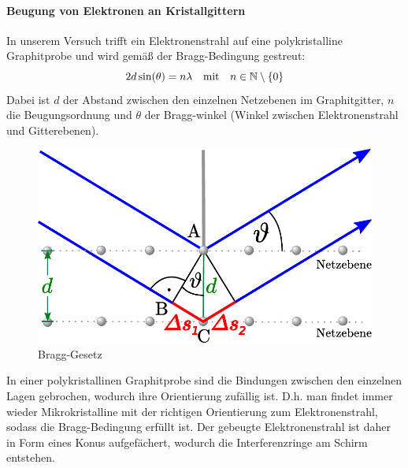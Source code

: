 \documentclass[ngerman]{scrartcl}
\begin{document}
\paragraph{Beugung von Elektronen an Kristallgittern}
%
In unserem Versuch trifft ein Elektronenstrahl auf eine polykristalline Graphitprobe und wird gemäß der Bragg-Bedingung gestreut:
%
\begin{equation}
    \label{eq:bragg}
    2 d \sin(\theta) = n \lambda \qq{mit} n \in \mathbb{N}\setminus\{0\}
\end{equation}
%
Dabei ist $d$ der Abstand zwischen den einzelnen Netzebenen im Graphitgitter, $n$ die Beugungsordnung und $\theta$ der Bragg-winkel (Winkel zwischen Elektronenstrahl und Gitterebenen).
%
\begin{figure}[H]
    \centering
    \begin{samepage}
        \includegraphics[width=0.4\linewidth]{fig/bragg-reflexion.pdf}
        \caption{Bragg-Gesetz}
        \label{fig:bragg_reflexion}
    \end{samepage}
\end{figure}
%
In einer polykristallinen Graphitprobe sind die Bindungen zwischen den einzelnen Lagen gebrochen, wodurch ihre Orientierung zufällig ist. D.h. man findet immer wieder
Mikrokristalline mit der richtigen Orientierung zum Elektronenstrahl, sodass die Bragg-Bedingung erfüllt ist. Der gebeugte Elektronenstrahl ist daher in Form eines Konus aufgefächert, wodurch die Interferenzringe am Schirm entstehen.
%
\end{document}
